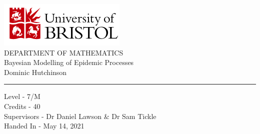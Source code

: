 \documentclass[11pt,a4paper]{article}
\theoremstyle{break}
\begin{document}

\makeatletter
\newcommand{\smallsym}[2]{#1{\mathpalette\make@small@sym{#2}}}
\newcommand{\make@small@sym}[2]{%
  \vcenter{\hbox{$\m@th\downgrade@style#1#2$}}%
}
\newcommand{\downgrade@style}[1]{%
  \ifx#1\displaystyle\scriptstyle\else
    \ifx#1\textstyle\scriptstyle\else
      \scriptscriptstyle
  \fi\fi
}
\makeatother

\thispagestyle{empty}

\vspace*{\fill}
\begin{center}
  \includegraphics[scale=1]{logo_uob_colour.PNG}\\
  \vspace*{1.0cm}
  DEPARTMENT OF MATHEMATICS\\
  \vspace*{2.0cm}
  {\LARGE Bayesian Modelling of Epidemic Processes} \\
  \vspace*{1.0cm}
  {\Large Dominic Hutchinson}\\

  \vspace*{1.0cm}
  \rule{0.5\textwidth}{0.5pt}
  \vspace*{1.0cm}

  {Level - 7/M}\\
  {Credits - 40}\\
  {Supervisors - Dr Daniel Lawson \& Dr Sam Tickle}\\
  {Handed In - May 14, 2021}

\end{center}
\vspace*{\fill}

\newpage
\setcounter{page}{1}




\end{document}
